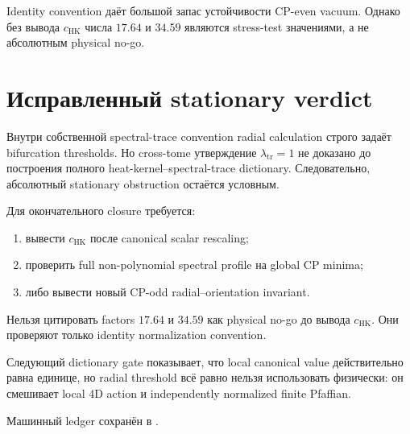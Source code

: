 \begin{proposition}
Identity convention даёт большой запас устойчивости CP-even vacuum. Однако
без вывода $c_{\mathrm{HK}}$ числа $17.64$ и $34.59$ являются stress-test
значениями, а не абсолютным physical no-go.
\end{proposition}

\section{Исправленный stationary verdict}

\begin{theorem}
Внутри собственной spectral-trace convention radial calculation строго
задаёт bifurcation thresholds. Но cross-tome утверждение
$\lambda_{\mathrm{tr}}=1$ не доказано до построения полного
heat-kernel--spectral-trace dictionary. Следовательно, абсолютный stationary
obstruction остаётся условным.
\end{theorem}

Для окончательного closure требуется:
\begin{enumerate}
\item вывести $c_{\mathrm{HK}}$ после canonical scalar rescaling;
\item проверить full non-polynomial spectral profile на global CP minima;
\item либо вывести новый CP-odd radial--orientation invariant.
\end{enumerate}

\begin{nogocriterion}
Нельзя цитировать factors $17.64$ и $34.59$ как physical no-go до вывода
$c_{\mathrm{HK}}$. Они проверяют только identity normalization convention.
\end{nogocriterion}

\begin{remark}
Следующий dictionary gate показывает, что local canonical value действительно
равна единице, но radial threshold всё равно нельзя использовать физически:
он смешивает local 4D action и independently normalized finite Pfaffian.
\end{remark}

Машинный ledger сохранён в
.